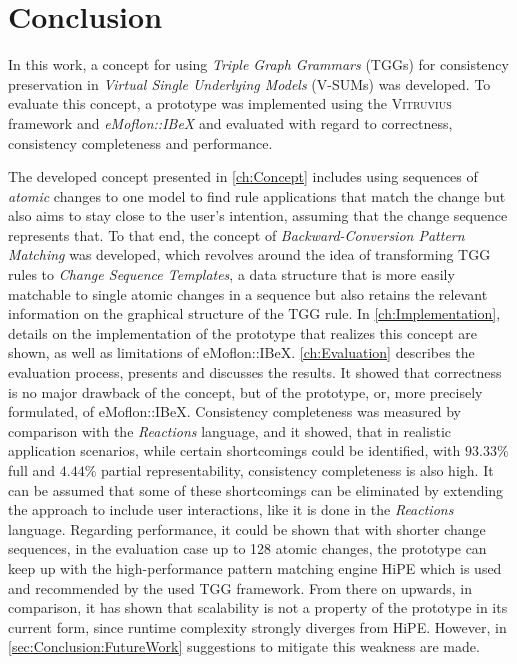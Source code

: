 
\chapter{Conclusion}
\label{ch:Conclusion}
In this work, a concept for using \emph{Triple Graph Grammars} (TGGs) for consistency preservation in \emph{Virtual Single Underlying Models} (V-SUMs)
was developed. To evaluate this concept, a prototype was implemented using the \textsc{Vitruvius} framework and \emph{eMoflon::IBeX} 
and evaluated with regard to correctness, consistency completeness and performance. 

The developed concept presented in \autoref{ch:Concept} includes using sequences of \emph{atomic} changes to one model to find rule applications that match the change
but also aims to stay close to the user's intention, assuming that the change sequence represents that.
To that end, the concept of \emph{Backward-Conversion Pattern Matching} was developed, which revolves around the idea of transforming TGG rules to \emph{Change Sequence Templates}, a data structure that is more easily matchable to single atomic changes 
in a sequence but also retains the relevant information on the graphical structure of the TGG rule.
In \autoref{ch:Implementation}, details on the implementation of the prototype that realizes this concept are shown, 
as well as limitations of eMoflon::IBeX.
\autoref{ch:Evaluation} describes the evaluation process, presents and discusses the results. It showed that correctness is no 
major drawback of the concept, but of the prototype, or, more precisely formulated, of eMoflon::IBeX. 
Consistency completeness was measured by comparison with the \emph{Reactions} language, and it showed, that in realistic 
application scenarios, while certain shortcomings could be identified, with $93.33\%$ full and $4.44\%$ partial representability, consistency completeness is also high.
It can be assumed that some of these shortcomings can be eliminated by extending the approach to include
user interactions, like it is done in the \emph{Reactions} language.
Regarding performance, it could be shown that with shorter change sequences, in the evaluation case up to 128 atomic changes, 
the prototype can keep up with the high-performance pattern matching engine HiPE which is used and recommended 
by the used TGG framework. From there on upwards, in comparison, it has shown that scalability is not a property 
of the prototype in its current form, since runtime complexity strongly diverges from HiPE. However, in \autoref{sec:Conclusion:FutureWork} suggestions to mitigate this weakness are made.

